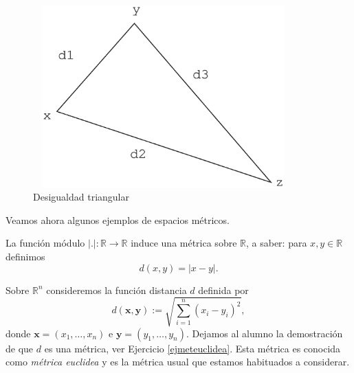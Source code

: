 \begin{figure}[h]

\begin{center}




\includegraphics[height=7cm, width=10cm]{triang.eps}


 \caption{Desigualdad triangular}\label{desigtriang}


\end{center}

\end{figure}

Veamos ahora algunos ejemplos de espacios m\'etricos.

\begin{ejemplo} La funci\'on m\'odulo $|.|:\mathbb{R}\rightarrow
\mathbb{R}$ induce una m\'etrica sobre $\mathbb{R}$, a saber: para
$x,y\in\mathbb{R}$ definimos
\begin{equation}\label{distmod}
	d(x,y)=|x-y|.
\end{equation}
\end{ejemplo}

\begin{ejemplo}\label{ejem,disteuclidea} Sobre $\mathbb{R}^n$
consideremos la funci\'on
distancia $d$ definida por
\begin{equation}\label{meteuclidea}
	d(\mathbf{x},\mathbf{y}):=\sqrt{\sum\limits_{i=1}^{n}(x_i-y_i)^2},
\end{equation}
donde $\mathbf{x}=(x_1,\dots,x_n)$ e $\mathbf{y}=(y_1,\dots,y_n)$.
Dejamos al alumno la demostraci\'on de que $d$ es una m\'etrica,
ver Ejercicio \vref{ejmeteuclidea}. Esta m\'etrica es conocida
como \emph{m\'etrica euclidea} y es la m\'etrica usual que estamos
habituados a considerar.
\end{ejemplo}

